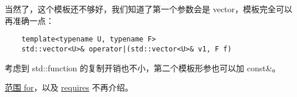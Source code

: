 当然了，这个模板还不够好，我们知道了第一个参数会是 vector，模板完全可以再准确一点：

\begin{verbatim}
    template<typename U, typename F>
    std::vector<U>& operator|(std::vector<U>& v1, F f)
\end{verbatim}

考虑到 std::function 的复制开销也不小，第二个模板形参也可以加 const\&。

\href{https://zh.cppreference.com/w/cpp/language/range-for}{范围 for}，以及 \href{https://zh.cppreference.com/w/cpp/language/requires}{requires} 不再介绍。

\clearpage